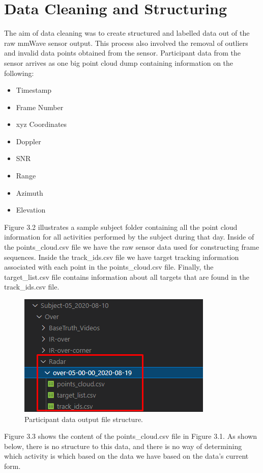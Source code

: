 \section{Data Cleaning and Structuring}
The aim of data cleaning was to create structured and labelled data out of the raw mmWave sensor output. This process also involved the removal of outliers and invalid data points obtained from the sensor. Participant data from the sensor arrives as one big point cloud dump containing information on the following:
\begin{itemize}
    \item Timestamp
    \item Frame Number
    \item xyz Coordinates
    \item Doppler
    \item SNR
    \item Range
    \item Azimuth
    \item Elevation
\end{itemize}

Figure 3.2 illustrates a sample subject folder containing all the point cloud information for all activities performed by the subject during that day. Inside of the points\_cloud.csv file we have the raw sensor data used for constructing frame sequences. Inside the track\_ids.csv file we have target tracking information associated with each point in the points\_cloud.csv file. Finally, the target\_list.csv file contains information about all targets that are found in the track\_ids.csv file.

\begin{figure}[H]
    \centering
    \includegraphics{raw_data.png}
    \caption{Participant data output file structure.}
    \label{fig:my_label}
\end{figure}

Figure 3.3 shows the content of the points\_cloud.csv file in Figure 3.1. As shown below, there is no structure to this data, and there is no way of determining which activity is which based on the data we have based on the data's current form. 

